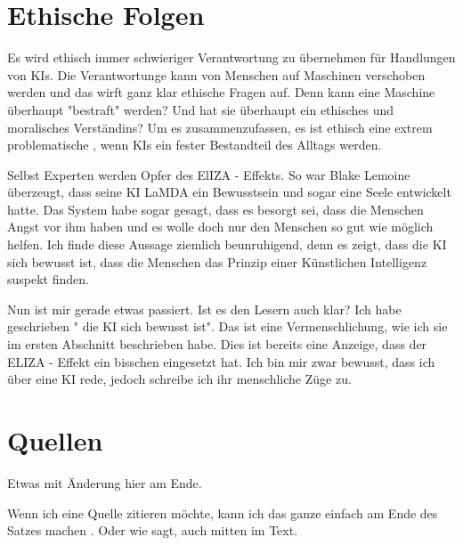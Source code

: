 \documentclass{report}
\begin{document}
\section{Ethische Folgen}
Es wird ethisch immer schwieriger Verantwortung zu übernehmen für Handlungen von KIs. Die Verantwortunge kann von Menschen auf Maschinen verschoben werden und das wirft ganz klar ethische Fragen auf. Denn kann eine Maschine überhaupt "bestraft" werden? Und hat sie überhaupt ein ethisches und moralisches Verständins? Um es zusammenzufassen, es ist ethisch eine extrem problematische , wenn KIs ein fester Bestandteil des Alltags werden.
\par
Selbst Experten werden Opfer des ElIZA - Effekts. So war Blake Lemoine überzeugt, dass seine KI LaMDA ein Bewusstsein und sogar eine Seele entwickelt hatte. Das System habe sogar gesagt, dass es besorgt sei, dass die Menschen Angst vor ihm haben und es wolle doch nur den Menschen so gut wie möglich helfen. Ich finde diese Aussage ziemlich beunruhigend, denn es zeigt, dass die KI sich bewusst ist, dass die Menschen das Prinzip einer Künstlichen Intelligenz suspekt finden. 
\par
Nun ist mir gerade etwas passiert. Ist es den Lesern auch klar? Ich habe geschrieben " die KI sich bewusst ist". Das ist eine Vermenschlichung, wie ich sie im ersten Abschnitt beschrieben habe. Dies ist bereits eine Anzeige, dass der ELIZA - Effekt ein bisschen eingesetzt hat. Ich bin mir zwar bewusst, dass ich über eine KI rede, jedoch schreibe ich ihr menschliche Züge zu. 




\section{Quellen}

Etwas mit Änderung hier am Ende.

Wenn ich eine Quelle zitieren möchte, kann ich das ganze einfach am Ende des Satzes machen \citep{example}. Oder wie \citet{example} sagt, auch mitten im Text.

\printbibliography
\end{document}
